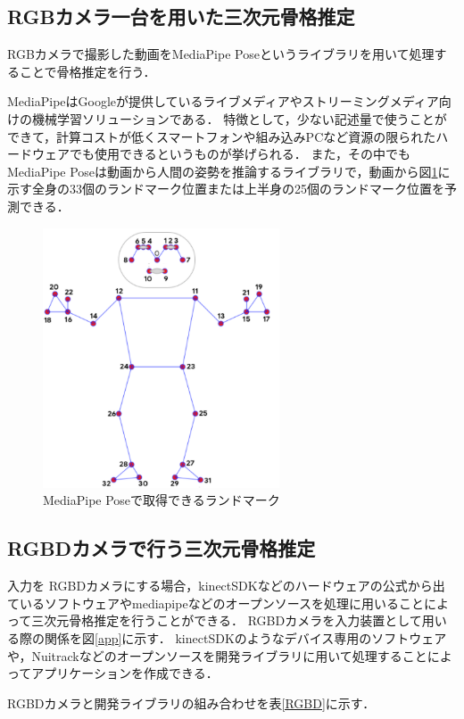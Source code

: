 \documentclass[titlepage]{jarticle}
\begin{document}
\subsection{RGBカメラ一台を用いた三次元骨格推定}
%
RGBカメラで撮影した動画をMediaPipe Pose\cite{cubemos}というライブラリを用いて処理することで骨格推定を行う．

MediaPipeはGoogleが提供しているライブメディアやストリーミングメディア向けの機械学習ソリューションである．
特徴として，少ない記述量で使うことができて，計算コストが低くスマートフォンや組み込みPCなど資源の限られたハードウェアでも使用できるというものが挙げられる．
また，その中でもMediaPipe Poseは動画から人間の姿勢を推論するライブラリで，動画から図\ref{RGB}に示す全身の33個のランドマーク位置または上半身の25個のランドマーク位置を予測できる．

\begin{figure}[b!]
  \centering
  \includegraphics[width=7cm]{img/media.png}
  \caption{MediaPipe Poseで取得できるランドマーク}
  \label{RGB}
\end{figure}

\subsection{RGBDカメラで行う三次元骨格推定}
入力を
RGBDカメラにする場合，kinectSDK\cite{kinectSDK}などのハードウェアの公式から出ているソフトウェアやmediapipe\cite{cubemos}などのオープンソースを処理に用いることによって三次元骨格推定を行うことができる．
RGBDカメラを入力装置として用いる際の関係を図\ref{app}に示す．
kinectSDK\cite{kinectSDK}のようなデバイス専用のソフトウェアや，Nuitrack\cite{cubemos}などのオープンソースを開発ライブラリに用いて処理することによってアプリケーションを作成できる．


RGBDカメラと開発ライブラリの組み合わせを表\ref{RGBD}に示す．
\end{document}
